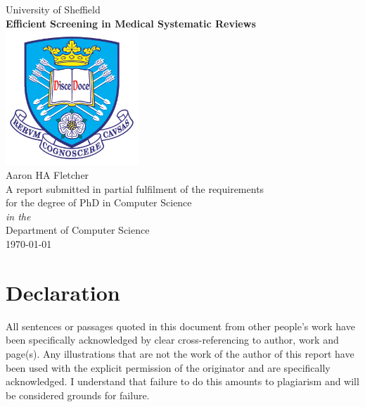 \documentclass[10pt,oneside]{book}
\begin{document}

\begin{titlepage}



\begin{center}
{\LARGE University of Sheffield}\\[1.5cm]
\linespread{1.2}\huge {\bfseries Efficient Screening in Medical Systematic Reviews}\\[1.5cm]
\linespread{1}
\includegraphics[width=5cm]{Confirmation Review/images/tuoslogo.png}\\[1cm]
{\Large Aaron HA Fletcher}\\[1cm]
\large A report submitted in partial fulfilment of the requirements\\ for the degree of PhD in Computer Science\\[0.3cm] 
\textit{in the}\\[0.3cm]
Department of Computer Science\\[2cm]
\today
\end{center}

\end{titlepage}


\newpage
\section*{\Large Declaration}

All sentences or passages quoted in this document from other people's work have been specifically acknowledged by clear cross-referencing to author, work and page(s).  Any illustrations that are not the work of the author of this report have been used with the explicit permission of the originator and are specifically acknowledged.  I understand that failure to do this amounts to plagiarism and will be considered grounds for failure.
\end{document}
